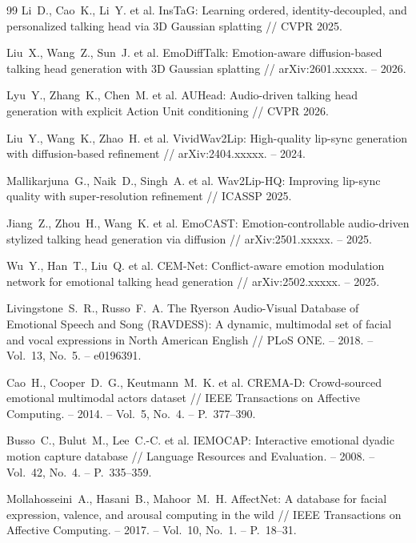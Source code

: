 \documentclass[a4paper, 12pt, oneside, openany]{article}
\begin{document}
\begin{thebibliography}{99}
Li~D., Cao~K., Li~Y. et al. InsTaG: Learning ordered, identity-decoupled, and personalized talking head via 3D Gaussian splatting // CVPR 2025.

Liu~X., Wang~Z., Sun~J. et al. EmoDiffTalk: Emotion-aware diffusion-based talking head generation with 3D Gaussian splatting // arXiv:2601.xxxxx. -- 2026.

Lyu~Y., Zhang~K., Chen~M. et al. AUHead: Audio-driven talking head generation with explicit Action Unit conditioning // CVPR 2026.

Liu~Y., Wang~K., Zhao~H. et al. VividWav2Lip: High-quality lip-sync generation with diffusion-based refinement // arXiv:2404.xxxxx. -- 2024.

Mallikarjuna~G., Naik~D., Singh~A. et al. Wav2Lip-HQ: Improving lip-sync quality with super-resolution refinement // ICASSP 2025.

Jiang~Z., Zhou~H., Wang~K. et al. EmoCAST: Emotion-controllable audio-driven stylized talking head generation via diffusion // arXiv:2501.xxxxx. -- 2025.

Wu~Y., Han~T., Liu~Q. et al. CEM-Net: Conflict-aware emotion modulation network for emotional talking head generation // arXiv:2502.xxxxx. -- 2025.

Livingstone~S.~R., Russo~F.~A. The Ryerson Audio-Visual Database of Emotional Speech and Song (RAVDESS): A dynamic, multimodal set of facial and vocal expressions in North American English // PLoS ONE. -- 2018. -- Vol.~13, No.~5. -- e0196391.

Cao~H., Cooper~D.~G., Keutmann~M.~K. et al. CREMA-D: Crowd-sourced emotional multimodal actors dataset // IEEE Transactions on Affective Computing. -- 2014. -- Vol.~5, No.~4. -- P.~377--390.

Busso~C., Bulut~M., Lee~C.-C. et al. IEMOCAP: Interactive emotional dyadic motion capture database // Language Resources and Evaluation. -- 2008. -- Vol.~42, No.~4. -- P.~335--359.

Mollahosseini~A., Hasani~B., Mahoor~M.~H. AffectNet: A database for facial expression, valence, and arousal computing in the wild // IEEE Transactions on Affective Computing. -- 2017. -- Vol.~10, No.~1. -- P.~18--31.


\end{thebibliography}
\end{document}
